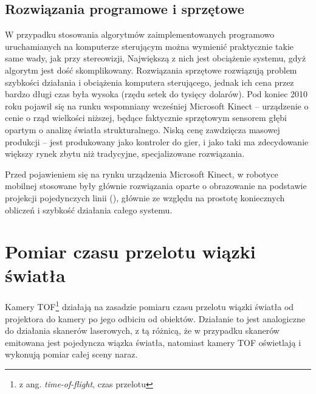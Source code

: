 \subsection{Rozwiązania programowe i sprzętowe} 

W przypadku stosowania algorytmów zaimplementowanych programowo uruchamianych na
komputerze sterującym można wymienić praktycznie takie same wady, jak przy
stereowizji, Największą z nich jest obciążenie systemu, gdyż algorytm jest
dość skomplikowany. Rozwiązania sprzętowe rozwiązują problem szybkości działania
i obciążenia komputera sterującego, jednak ich cena przez bardzo długi czas
była wysoka (rzędu setek do tysięcy dolarów). Pod koniec 2010 roku pojawił się
na runku wspomniany wcześniej Microsoft Kinect -- urządzenie o cenie o
rząd wielkości niższej, będące faktycznie sprzętowym sensorem głębi opartym o
analizę światła strukturalnego. Niską cenę zawdzięcza masowej produkcji -- jest
produkowany jako kontroler do gier, i jako taki ma zdecydowanie większy rynek
zbytu niż tradycyjne, specjalizowane rozwiązania. 

Przed pojawieniem się na rynku urządzenia Microsoft Kinect, w robotyce mobilnej
stosowane były głównie rozwiązania oparte o obrazowanie na podstawie projekcji
pojedynczych linii (\cite{120445,5246792}), głównie ze względu na prostotę
koniecznych obliczeń i szybkość działania całego systemu. 


\section{Pomiar czasu przelotu wiązki światła}

Kamery TOF\footnote{z ang. {\it time-of-flight}, czas przelotu} działają na zasadzie
pomiaru czasu przelotu wiązki światła od projektora do kamery po jego odbiciu od
obiektów. Działanie to jest analogiczne do działania skanerów laserowych, z tą różnicą,
że w przypadku skanerów emitowana jest pojedyncza wiązka światła, natomiast kamery TOF
oświetlają i wykonują pomiar całej sceny naraz.


